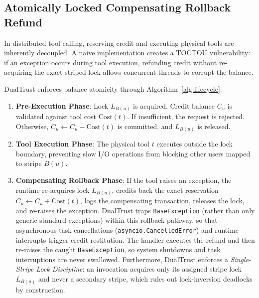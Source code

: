 \documentclass[manuscript, screen, review]{jair}
\begin{document}
\subsection{Atomically Locked Compensating Rollback Refund}
In distributed tool calling, reserving credit and executing physical tools are inherently decoupled. A naive implementation creates a TOCTOU vulnerability: if an exception occurs during tool execution, refunding credit without re-acquiring the exact striped lock allows concurrent threads to corrupt the balance.

DualTrust enforces balance atomicity through Algorithm~\ref{alg:lifecycle}:
\begin{enumerate}[leftmargin=12pt, topsep=2pt, itemsep=1pt]
\item \textbf{Pre-Execution Phase}: Lock $L_{B(u)}$ is acquired. Credit balance $C_u$ is validated against tool cost $\text{Cost}(t)$. If insufficient, the request is rejected. Otherwise, $C_u \leftarrow C_u - \text{Cost}(t)$ is committed, and $L_{B(u)}$ is released.
\item \textbf{Tool Execution Phase}: The physical tool $t$ executes outside the lock boundary, preventing slow I/O operations from blocking other users mapped to stripe $B(u)$.
\item \textbf{Compensating Rollback Phase}: If the tool raises an exception, the runtime re-acquires lock $L_{B(u)}$, credits back the exact reservation $C_u \leftarrow C_u + \text{Cost}(t)$, logs the compensating transaction, releases the lock, and re-raises the exception. DualTrust traps \texttt{BaseException} (rather than only generic standard exceptions) within this rollback pathway, so that asynchronous task cancellations (\texttt{asyncio.CancelledError}) and runtime interrupts trigger credit restitution. The handler executes the refund and then re-raises the caught \texttt{BaseException}, so system shutdowns and task interruptions are never swallowed. Furthermore, DualTrust enforces a \emph{Single-Stripe Lock Discipline}: an invocation acquires only its assigned stripe lock $L_{B(u)}$ and never a secondary stripe, which rules out lock-inversion deadlocks by construction.
\end{enumerate}
\end{document}

